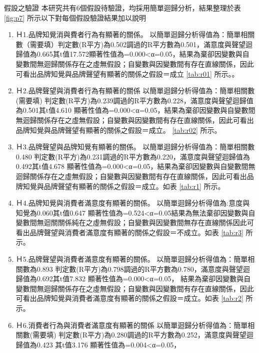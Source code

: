 假設之驗證
本研究共有6個假設待驗證，均採用簡單迴歸分析，結果整理於表 \ref{fig:p7} 所示以下對每個假設驗證結果加以說明
\begin{enumerate}
\item Ｈ1.品牌知覺消與費者行為有顯著的關係。
以簡單迴歸分析得值為：簡單相關數（需要填）判定數(R平方)為0.502調過的R平方數為0.501，滿意度與聲望迴歸值為0.665其t值17.572顯著性值為=0.000<α=0.05，結果為棄卻因變數與自變數間無迴歸關係存在之虛無假設；自變數與因變數間有存在直線關係，因此可看出品牌知覺與品牌聲望有顯著的關係之假設＝成立 \ref{tab:r01}  所示。。
\item Ｈ2.品牌聲望與消費者行為有顯著的關係
以簡單迴歸分析得值為：簡單相關數(需要填) 判定數(R平方)為0.239調過的R平方數為0.228，滿意度與聲望迴歸值為0.501其t值4.610 顯著性值為=0.000<α=0.05，結果為棄卻因變數與自變數間無迴歸關係存在之虛無假設；自變數與因變數間有存在直線關係，因此可看出品牌知覺與品牌聲望有顯著的關係之假設＝成立。 \ref{tab:r02}  所示。
\item Ｈ3.品牌聲望與品牌知覺有顯著的關係。
以簡單迴歸分析得值為：簡單相關數0.480 判定數(R平方)為0.231調過的R平方數為0.220，滿意度與聲望迴歸值為0.492其t值4.678 顯著性值為=0.000<α=0.05，結果為棄卻因變數與自變數間無迴歸關係存在之虛無假設；自變數與因變數間有存在直線關係，因此可看出品牌知覺與品牌聲望有顯著的關係之假設＝成立。如表 \ref{tab:r1}  所示。
\item Ｈ4.品牌知覺與消費者滿意度有顯著的關係。
以簡單迴歸分析得值為:意度與知覺為0.060其t值0.647 顯著性值為=0.524<α=0.05結果為無法棄卻因變數與自變數間無迴關關係純在之虛無假設；自變數與因變數間無存在直線關係因此可看出品牌聲望與消費者滿意度有顯著的關係之假設＝不成立。如表 \ref{tab:r3}  所示。
\item Ｈ5.品牌聲望與消費者滿意度有顯著的關係。
以簡單迴歸分析得值為：簡單相關數為0.893 判定數(R平方)為0.798調過的R平方數為0.780，滿意度與聲望迴歸值為0.692其t值7.832 顯著性值為=0.000<α=0.05， 結果為棄卻因變數與自變數間無迴歸關係存在之虛無假設；自變數與因變數間有存在直線關係，因此可看出品牌知覺與消費者滿意度有顯著的關係之假設＝成立。如表 \ref{tab:r2}  所示。
\item Ｈ6.消費者行為與消費者滿意度有顯著的關係
以簡單迴歸分析得值為：簡單相關數(需要填) 判定數(R平方)為0.280調過的R平方數為0.252，滿意度與聲望迴歸值為0.423 其t值3.176 顯著性值為=0.004<α=0.05，%
\end{enumerate}


